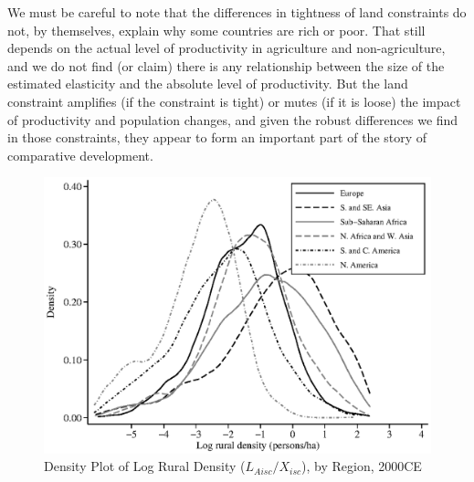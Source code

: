 \documentclass[11pt]{article}
\begin{document}
We must be careful to note that the differences in tightness of land constraints do not, by themselves, explain why some countries are rich or poor. That still depends on the actual level of productivity in agriculture and non-agriculture, and we do not find (or claim) there is any relationship between the size of the estimated elasticity and the absolute level of productivity. But the land constraint amplifies (if the constraint is tight) or mutes (if it is loose) the impact of productivity and population changes, and given the robust differences we find in those constraints, they appear to form an important part of the story of comparative development.

\newpage

\clearpage

\onehalfspacing
{\small


}

\clearpage

\begin{figure}[!htb]
\begin{center}
\caption{Density Plot of Log Rural Density ($L_{Aisc}/X_{isc}$), by Region, 2000CE}
\label{FIG_dens_rurd}
\includegraphics[width=1.0\textwidth]{fig_dens_rurd.eps}
\end{center}
\vspace{-.5cm}
\end{figure}
\end{document}
